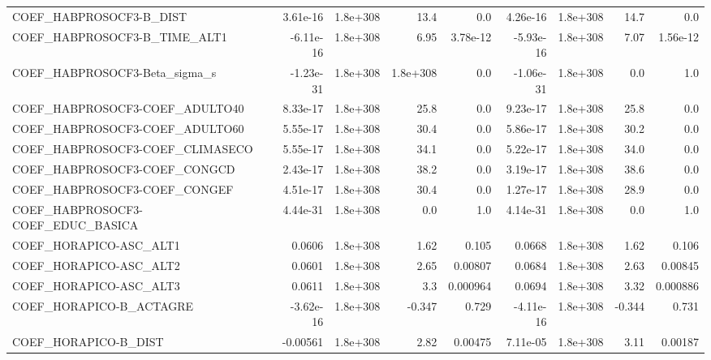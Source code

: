 \begin{tabular}{lrrrrrrrr}
COEF\_HABPROSOCF3-B\_DIST           &    3.61e-16 &     1.8e+308 &      13.4 &      0.0 &   4.26e-16 &    1.8e+308 &         14.7 &           0.0 \\
COEF\_HABPROSOCF3-B\_TIME\_ALT1      &   -6.11e-16 &     1.8e+308 &      6.95 & 3.78e-12 &  -5.93e-16 &    1.8e+308 &         7.07 &      1.56e-12 \\
COEF\_HABPROSOCF3-Beta\_sigma\_s     &   -1.23e-31 &     1.8e+308 &  1.8e+308 &      0.0 &  -1.06e-31 &    1.8e+308 &          0.0 &           1.0 \\
COEF\_HABPROSOCF3-COEF\_ADULTO40    &    8.33e-17 &     1.8e+308 &      25.8 &      0.0 &   9.23e-17 &    1.8e+308 &         25.8 &           0.0 \\
COEF\_HABPROSOCF3-COEF\_ADULTO60    &    5.55e-17 &     1.8e+308 &      30.4 &      0.0 &   5.86e-17 &    1.8e+308 &         30.2 &           0.0 \\
COEF\_HABPROSOCF3-COEF\_CLIMASECO   &    5.55e-17 &     1.8e+308 &      34.1 &      0.0 &   5.22e-17 &    1.8e+308 &         34.0 &           0.0 \\
COEF\_HABPROSOCF3-COEF\_CONGCD      &    2.43e-17 &     1.8e+308 &      38.2 &      0.0 &   3.19e-17 &    1.8e+308 &         38.6 &           0.0 \\
COEF\_HABPROSOCF3-COEF\_CONGEF      &    4.51e-17 &     1.8e+308 &      30.4 &      0.0 &   1.27e-17 &    1.8e+308 &         28.9 &           0.0 \\
COEF\_HABPROSOCF3-COEF\_EDUC\_BASICA &    4.44e-31 &     1.8e+308 &       0.0 &      1.0 &   4.14e-31 &    1.8e+308 &          0.0 &           1.0 \\
COEF\_HORAPICO-ASC\_ALT1            &      0.0606 &     1.8e+308 &      1.62 &    0.105 &     0.0668 &    1.8e+308 &         1.62 &         0.106 \\
COEF\_HORAPICO-ASC\_ALT2            &      0.0601 &     1.8e+308 &      2.65 &  0.00807 &     0.0684 &    1.8e+308 &         2.63 &       0.00845 \\
COEF\_HORAPICO-ASC\_ALT3            &      0.0611 &     1.8e+308 &       3.3 & 0.000964 &     0.0694 &    1.8e+308 &         3.32 &      0.000886 \\
COEF\_HORAPICO-B\_ACTAGRE           &   -3.62e-16 &     1.8e+308 &    -0.347 &    0.729 &  -4.11e-16 &    1.8e+308 &       -0.344 &         0.731 \\
COEF\_HORAPICO-B\_DIST              &    -0.00561 &     1.8e+308 &      2.82 &  0.00475 &   7.11e-05 &    1.8e+308 &         3.11 &       0.00187 \\

\end{tabular}
